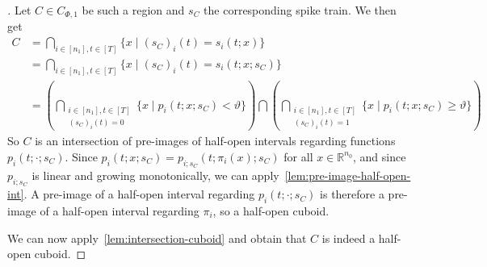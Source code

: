 \begin{proof}[]
  Let \(C∈C_{Φ,1}\) be such a region and \(s_C\) the corresponding spike train. We then get
  \begin{align*}
    C&=\bigcap_{i∈[n_1],t∈[T]}\{x\mid (s_C)_i(t) =s_i(t;x)\} \\
     &=\bigcap_{i∈[n_1],t∈[T]}\{x\mid (s_C)_i(t) =s_i(t;x;s_C)\} \\
     &= \left(\bigcap_{\substack{i∈[n_1],t∈[T] \\ (s_C)_i(t)=0}}\{x\mid p_i(t;x;s_C)<ϑ\}\right) \bigcap \left(\bigcap_{\substack{i∈[n_1],t∈[T] \\ (s_C)_i(t)=1}}\{x\mid p_i(t;x;s_C)≥ϑ\}\right)
  \end{align*}
  So \(C\) is an intersection of pre-images of half-open intervals regarding functions \(p_i(t;·;s_C)\). Since \(p_i(t;x;s_C)=p_{i;s_C}(t;π_i(x);s_C)\) for all \(x∈ℝ^{n_0}\), and since \(p_{i;s_C}\) is linear and growing monotonically, we can apply~\autoref{lem:pre-image-half-open-int}. A pre-image of a half-open interval regarding \(p_i(t;·;s_C)\) is therefore a pre-image of a half-open interval regarding \(π_i\), so a half-open cuboid.

  We can now apply~\autoref{lem:intersection-cuboid} and obtain that \(C\) is indeed a half-open cuboid.




\end{proof}

